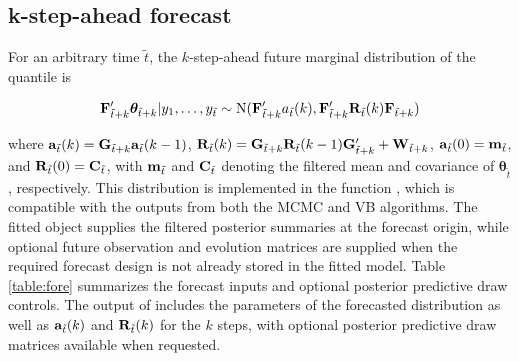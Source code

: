 \documentclass[jss]{jss}
\begin{document}
\subsection{k-step-ahead forecast}

For an arbitrary time $\tilde{t}$, the $k$-step-ahead future marginal distribution of the quantile is

\begin{equation}
{\bf F}'_{\tilde{t}+k} {\boldsymbol \theta}_{\tilde{t}+k}| y_1,\dots,y_{\tilde{t}} \sim \text{N}({\bf F}'_{\tilde{t}+k} a_{\tilde{t}}(k),{\bf F}'_{\tilde{t}+k}{\bf R}_{\tilde{t}}(k){\bf F}_{\tilde{t}+k})
\end{equation}

where ${\bf a}_{\tilde{t}}(k) = {\bf G}_{\tilde{t}+k} {\bf a}_{\tilde{t}}(k-1)$, ${\bf R}_{\tilde{t}}(k) = {\bf G}_{\tilde{t}+k} {\bf R}_{\tilde{t}}(k-1) {\bf G}_{\tilde{t}+k}' + {\bf W}_{\tilde{t}+k}$, ${\bf a}_{\tilde{t}}(0) = {\bf m}_{\tilde{t}}$, and ${\bf R}_{\tilde{t}}(0) = {\bf C}_{\tilde{t}}$, with ${\bf m}_{\tilde{t}}$ and ${\bf C}_{\tilde{t}}$ denoting the filtered mean and covariance of $\boldsymbol{\theta}_{\tilde{t}}$, respectively. This distribution is implemented in the function , which is compatible with the outputs from both the MCMC and VB algorithms. The fitted object supplies the filtered posterior summaries at the forecast origin, while optional future observation and evolution matrices are supplied when the required forecast design is not already stored in the fitted model. Table \ref{table:fore} summarizes the forecast inputs and optional posterior predictive draw controls. The output of  includes the parameters of the forecasted distribution as well as ${\bf a}_{\tilde{t}}(k)$ and ${\bf R}_{\tilde{t}}(k)$ for the $k$ steps, with optional posterior predictive draw matrices available when requested.
\end{document}
